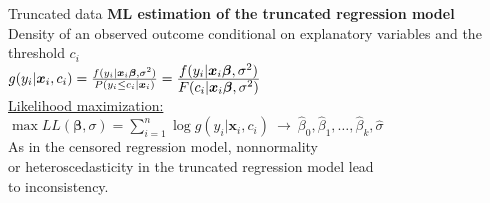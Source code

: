 \documentclass[usenames,dvipsnames]{beamer}
\newcommand{\mytikzmark}[2]{%
  \tikz[remember picture,inner sep=0pt,outer sep=0pt,baseline,anchor=base] 
    \node (#1) {\ensuremath{#2}};}
\begin{document}
\begin{frame}{Truncated data}
\textbf{ML estimation of the truncated regression model} \\
\bigskip
Density of an observed outcome conditional on explanatory variables and the threshold $c_i$ \\
\bigskip
$g(y_i|\bm{x}_i, c_i) = \frac{f(y_i|\bm{x}_i \bm{\beta}, \sigma^2)}{P(y_i \le c_i|\bm{x}_i)} = \frac{\mytikzmark{1}{f(y_i|\bm{x}_i \bm{\beta}, \sigma^2)}}{\mytikzmark{2}{F(c_i|\bm{x}_i \bm{\beta}, \sigma^2)}}$ \\
\bigskip
\underline{Likelihood maximization:} \\
\bigskip
$\max LL(\bm{\beta}, \sigma) = \sum \limits_{i=1}^{n} \log g(y_i|\bm{x}_i, c_i) \ \to \ \hat{\beta}_0, \hat{\beta}_1, \dots, \hat{\beta}_k, \hat{\sigma}$ \\
\bigskip
As in the censored regression model, nonnormality \\or heteroscedasticity in the truncated regression model lead \\to inconsistency. 
\end{frame}
\end{document}
